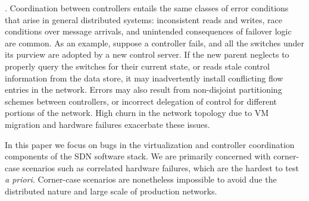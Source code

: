 . Coordination between controllers
entails the same classes of error
conditions that arise in general distributed systems: inconsistent reads and
writes, race conditions over message arrivals, and unintended consequences of failover
logic are common. As an example, suppose a controller fails, and all the
switches under its purview are adopted by a new control server. If the new parent
neglects to properly query the switches for their current state, or reads
stale control information from the data store, it may inadvertently install
conflicting flow entries in the network. Errors may also result 
from non-disjoint partitioning schemes between controllers, or incorrect delegation of control for different
portions of the network. 
High churn in the network topology due to VM migration and
hardware failures exacerbate these issues.

In this paper we focus on bugs in the virtualization and controller
coordination components of the SDN software stack. We are primarily concerned with corner-case scenarios such as
correlated hardware failures, which are
the hardest to test {\it a priori}. Corner-case scenarios are nonetheless
impossible to avoid due the distributed nature and large scale of
production networks.

